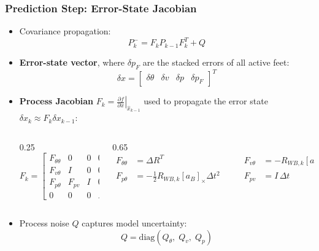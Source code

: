 \documentclass[aspectratio=169]{beamer}
\begin{document}
\begin{frame}
	\frametitle{Prediction Step: Error-State Jacobian}
	
	\begin{itemize}
		\item Covariance propagation:
		\begin{equation*}
			P_k^- = F_k P_{k-1} F_k^T + Q
		\end{equation*}
		
		\item \textbf{Error-state vector}, where $\delta p_F$ are the stacked errors of all active feet:
		\begin{equation*}
			\delta x =
			\begin{bmatrix}
				\delta\theta & \delta v & \delta p & \delta p_F
			\end{bmatrix}^T
		\end{equation*}
		
		\item \textbf{Process Jacobian} $F_k = \left.\frac{\partial f}{\partial x}\right|_{\hat{x}_{k-1}}$ used to propagate the error state $\delta x_k \approx F_k \delta x_{k-1}$:
		
		\vspace{-0.2cm}
		\begin{columns}[T]
			\begin{column}{0.25\textwidth}
				\begin{equation*}
					F_k =
					\begin{bmatrix}
						F_{\theta\theta} & 0 & 0 & 0 \\
						F_{v\theta} & I & 0 & 0 \\
						F_{p\theta} & F_{pv} & I & 0 \\
						0 & 0 & 0 & I
					\end{bmatrix}
				\end{equation*}
			\end{column}
			
			\begin{column}{0.65\textwidth}
				\begin{equation*}
					\begin{aligned}
						F_{\theta\theta} &= \Delta R^T 
						&\qquad
						F_{v\theta} &= -R_{WB,k}[a_B]_\times \Delta t \\
						F_{p\theta} &= -\frac{1}{2}R_{WB,k}[a_B]_\times \Delta t^2 
						&\qquad
						F_{pv} &= I\,\Delta t
					\end{aligned}
				\end{equation*}
			\end{column}
		\end{columns}
		
		\item Process noise $Q$ captures model uncertainty:
		\begin{equation*}
			Q = \mathrm{diag}(Q_\theta,\; Q_v,\; Q_p)
		\end{equation*}
	\end{itemize}	
\end{frame}
\end{document}
